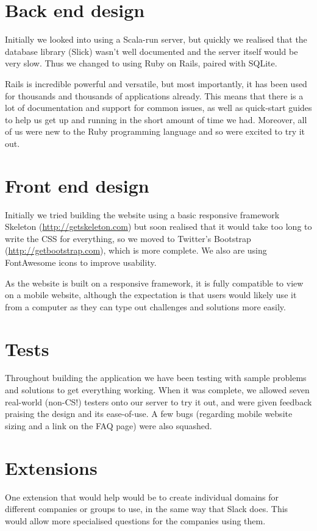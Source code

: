 \documentclass{report}
\begin{document}
\section{Back end design}
Initially we looked into using a Scala-run server, but quickly we realised that the database library (Slick) wasn’t well documented and the server itself would be very slow. Thus we changed to using Ruby on Rails, paired with SQLite.

Rails is incredible powerful and versatile, but most importantly, it has been used for thousands and thousands of applications already. This means that there is a lot of documentation and support for common issues, as well as quick-start guides to help us get up and running in the short amount of time we had. Moreover, all of us were new to the Ruby programming language and so were excited to try it out.

\section{Front end design}
Initially we tried building the website using a basic responsive framework Skeleton (\url{http://getskeleton.com}) but soon realised that it would take too long to write the CSS for everything, so we moved to Twitter’s Bootstrap (\url{http://getbootstrap.com}), which is more complete. We also are using FontAwesome icons to improve usability.

As the website is built on a responsive framework, it is fully compatible to view on a mobile website, although the expectation is that users would likely use it from a computer as they can type out challenges and solutions more easily.


\section{Tests}
Throughout building the application we have been testing with sample problems and solutions to get everything working. When it was complete, we allowed seven real-world (non-CS!) testers onto our server to try it out, and were given feedback praising the design and its ease-of-use. A few bugs (regarding mobile website sizing and a link on the FAQ page) were also squashed.

\section{Extensions}
One extension that would help would be to create individual domains for different companies or groups to use, in the same way that Slack does. This would allow more specialised questions for the companies using them.
\end{document}
